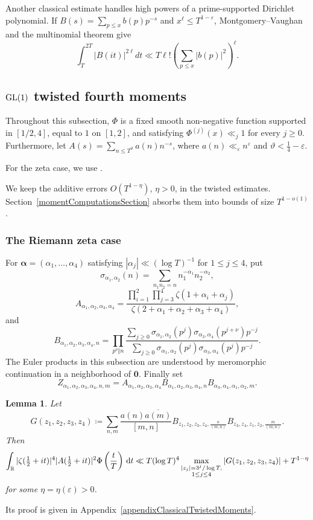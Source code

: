 \documentclass[oneside, 12pt]{amsart}
\newtheorem{lem}[thm]{Lemma}
\theoremstyle{definition}
\newcommand{\dt}{\, \textup{d}t}
\begin{document}
	{Another classical estimate handles high powers of a prime-supported
		Dirichlet polynomial.  If $B(s)=\sum_{p\leq x}b(p)p^{-s}$ and
		$x^\ell\leq T^{1-\varepsilon}$, Montgomery--Vaughan and the multinomial
		theorem give
		\[
		\int_T^{2T}|B(it)|^{2\ell}dt
		\ll T\ell!\left(\sum_{p\leq x}|b(p)|^2\right)^\ell.
		\]
	}
	\subsection{\texorpdfstring{$\textup{GL}(1)$}{GL(1)} twisted fourth moments}
	{Throughout this subsection, $\Phi$ is a fixed smooth non-negative
		function supported in $[1/2,4]$, equal to $1$ on $[1,2]$, and satisfying
		$\Phi^{(j)}(x)\ll_j1$ for every $j\geq0$.  Furthermore, let
		$A(s)=\sum_{n\leq T^{\vartheta}}a(n)n^{-s}$, where
		$a(n)\ll_\varepsilon n^\varepsilon$ and
		$\vartheta<\frac14-\varepsilon$.}
	
	{For the zeta case, we use
		\cite[Theorem~1.1 and the first remark thereafter]{BettinBuiLiRadziwill}.}
	
	
	{We keep the additive errors $O(T^{1-\eta})$, $\eta>0$,
		in the twisted estimates.  Section~\ref{momentComputationsSection}
		absorbs them into bounds of size $T^{1-o(1)}$.}
	\subsubsection{The Riemann zeta case}
	{For
		$\boldsymbol\alpha=(\alpha_1,\ldots,\alpha_4)$ satisfying
		$|\alpha_j|\ll(\log T)^{-1}$ for $1\leq j\leq4$, put
		\[
		\sigma_{\alpha_1,\alpha_2}(n)
		=\sum_{n_1n_2=n}n_1^{-\alpha_1}n_2^{-\alpha_2},
		\]
		\[
		A_{\alpha_1,\alpha_2,\alpha_3,\alpha_4}
		=\frac{\prod_{i=1}^{2}\prod_{j=3}^{4}
			\zeta(1+\alpha_i+\alpha_j)}
		{\zeta(2+\alpha_1+\alpha_2+\alpha_3+\alpha_4)},
		\]
		and
		\[
		B_{\alpha_1,\alpha_2,\alpha_3,\alpha_4,n}
		=\prod_{p^\nu\Vert n}
		\frac{\sum_{j\geq0}\sigma_{\alpha_1,\alpha_2}(p^j)
			\sigma_{\alpha_3,\alpha_4}(p^{j+\nu})p^{-j}}
		{\sum_{j\geq0}\sigma_{\alpha_1,\alpha_2}(p^j)
			\sigma_{\alpha_3,\alpha_4}(p^j)p^{-j}}.
		\]
		The Euler products in this subsection are understood by meromorphic
		continuation in a neighborhood of $\boldsymbol0$.  Finally set
		\[
		Z_{\alpha_1,\alpha_2,\alpha_3,\alpha_4,n,m}
		=A_{\alpha_1,\alpha_2,\alpha_3,\alpha_4}
		B_{\alpha_1,\alpha_2,\alpha_3,\alpha_4,n}
		B_{\alpha_3,\alpha_4,\alpha_1,\alpha_2,m}.
		\]
	}
	\begin{lem}\label{twistedFourthMomentUpperBoundMultiplicative}
		Let $$G(z_1,z_2,z_3,z_4)\coloneq \sum_{n,m} \frac{a(n)\overline{a(m)}}{[m,n]} B_{z_1,z_2,z_3,z_4,\frac{n}{(m,n)}}B_{z_3,z_4,z_1,z_2,\frac{m}{(m,n)}}.$$ Then {
			$$\int_{\mathbb{R}} |\zeta(\tfrac12+it)|^4|A(\tfrac12+it)|^2 \Phi\left(\frac{t}{T}\right)\dt \ll T(\log T)^4 \max_{\substack{|z_j|=3^j/\log T, \\ 1\leq j \leq 4}} |G(z_1,z_2,z_3,z_4)|+T^{1-\eta}$$
			for some $\eta=\eta(\varepsilon)>0$.}
	\end{lem}
	{Its proof is given in
		Appendix~\ref{appendixClassicalTwistedMoments}.}
	
\end{document}
